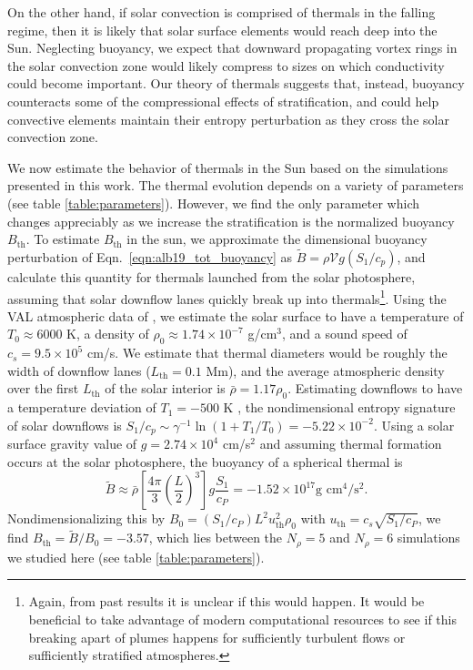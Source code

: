 On the other hand, if solar convection is comprised of thermals in the falling regime, then it is likely that solar surface elements would reach deep into the Sun.
Neglecting buoyancy, we expect that downward propagating vortex rings in the solar convection zone would likely compress to sizes on which conductivity could become important.
Our theory of thermals suggests that, instead, buoyancy counteracts some of the compressional effects of stratification, and could help convective elements maintain their entropy perturbation as they cross the solar convection zone.

We now estimate the behavior of thermals in the Sun based on the simulations presented in this work.
The thermal evolution depends on a variety of parameters (see table \ref{table:parameters}).
However, we find the only parameter which changes appreciably as we increase the stratification is the normalized buoyancy $B_\text{th}$.
To estimate $B_\text{th}$ in the sun, we approximate the dimensional buoyancy perturbation of Eqn.~\ref{eqn:alb19_tot_buoyancy} as $\tilde{B} = \rho \mathcal{V} g (S_1/c_p)$, and calculate this quantity for thermals launched from the solar photosphere, assuming that solar downflow lanes quickly break up into thermals\footnote{Again, from past results \citep{rast1999} it is unclear if this would happen. It would be beneficial to take advantage of modern computational resources to see if this breaking apart of plumes happens for sufficiently turbulent flows or sufficiently stratified atmospheres.}.
Using the VAL atmospheric data of \citet{avrett&loeser2008}, we estimate the solar surface to have a temperature of $T_0 \approx 6000$ K, a density of $\rho_0 \approx 1.74 \times 10^{-7}$ g/cm$^3$, and a sound speed of $c_s = 9.5 \times 10^5$ cm/s.
We estimate that thermal diameters would be roughly the width of downflow lanes ($L_{\text{th}} = 0.1$ Mm), and the average atmospheric density over the first $L_{\text{th}}$ of the solar interior is $\bar{\rho} = 1.17\rho_0$.
Estimating downflows to have a temperature deviation of $T_1 = -500$ K \citep{borrero&bellotrubio2002}, the nondimensional entropy signature of solar downflows is $S_1/c_p \sim \gamma^{-1}\ln(1 + T_1/T_0) = -5.22 \times 10^{-2}$.
Using a solar surface gravity value of $g = 2.74 \times 10^4$ cm/s$^2$ and assuming thermal formation occurs at the solar photosphere, the buoyancy of a spherical thermal is 
$$
\tilde{B} \approx \bar{\rho}\left[\frac{4\pi}{3} \left(\frac{L}{2}\right)^3\right] g \frac{S_1}{c_P} = -1.52 \times 10^{17} \text{g cm}^4/\text{s}^2.
$$
Nondimensionalizing this by $B_0 = (S_1/c_P) L^2 u_{\text{th}}^2 \rho_0$ with $u_{\text{th}} = c_s \sqrt{S_1/c_P}$, we find $B_\text{th} = \tilde{B}/B_0 = -3.57$, which lies between the $N_\rho = 5$ and $N_\rho = 6$ simulations we studied here (see table \ref{table:parameters}).

